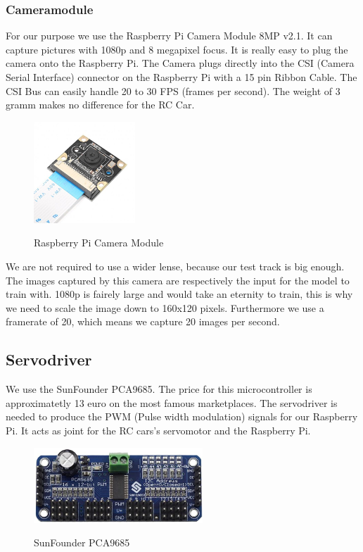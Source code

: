 \documentclass[journal]{IEEEtran}
\begin{document}
\subsubsection{Cameramodule}
For our purpose we use the Raspberry Pi Camera Module 8MP v2.1. It can capture pictures with 1080p and 8 megapixel focus. 
It is really easy to plug the camera onto the Raspberry Pi. The Camera plugs directly into the CSI (Camera Serial Interface) connector on the Raspberry Pi with a 15 pin Ribbon Cable. The CSI Bus can easily handle 20 to 30 FPS (frames per second). The weight of 3 gramm makes no difference for the RC Car. \\

\begin{figure}
  \begin{center}
  \includegraphics[width=1.5in]{photo/camera.jpg}\\
  \caption{Raspberry Pi Camera Module}\label{camera}
  \end{center}
\end{figure}

We are not required to use a wider lense, because our test track is big enough. The images captured by this camera are respectively the input for the model to train with. 1080p is fairely large and would take an eternity to train, this is why we need to scale the image down to 160x120 pixels. Furthermore we use a framerate of 20, which means we capture 20 images per second.  

\subsection{Servodriver}
We use the SunFounder PCA9685. The price for this microcontroller is approximatetly 13 euro on the most famous marketplaces. The servodriver is needed to produce the PWM (Pulse width modulation) signals for our Raspberry Pi. It acts as joint for the RC cars's servomotor and the Raspberry Pi. \\

\begin{figure}
  \begin{center}
  \includegraphics[width=2.5in]{photo/sunfounder.jpeg}\\
  \caption{SunFounder PCA9685}\label{servodriver}
  \end{center}
\end{figure}
\end{document}
